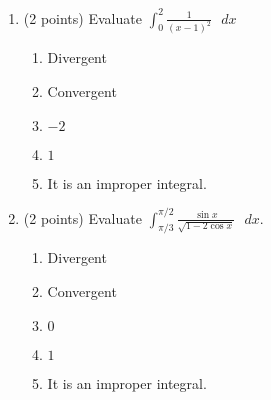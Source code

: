 \documentclass[paper=a4, fontsize=11pt]{scrartcl} %
\numberwithin{equation}{section} %
\numberwithin{figure}{section} %
\numberwithin{table}{section} %
\begin{document}
\begin{enumerate}
\item (2 points) Evaluate \large $\int_0^2\frac{1}{(x-1)^2}\text{  }dx$
\normalsize \begin{enumerate}
    \item Divergent
    \item Convergent
    \item $-2$
    \item $1$
    \item It is an improper integral.
  \end{enumerate}

\item (2 points) Evaluate \large$\int_{\pi/3}^{\pi/2}\frac{\sin x}{\sqrt{1-2\cos x}}\text{  }dx$.
  \vspace{2mm}
   \normalsize \begin{enumerate}
      \item Divergent
      \item Convergent
      \item $0$
      \item $1$
      \item It is an improper integral.
      \end{enumerate}  
  
\end{enumerate}




\end{document}
